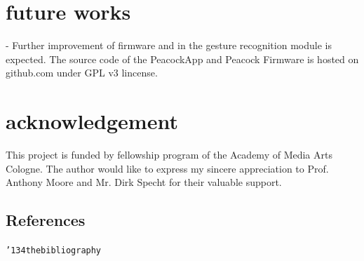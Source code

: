 \documentclass{nime-alternate}
\begin{document}
\section{future works}

- Further improvement of firmware and in the gesture recognition module is expected.
The source code of the PeacockApp and Peacock Firmware is hosted on github.com under GPL v3 lincense.


\section{acknowledgement}
This project is funded by fellowship program of the Academy of Media Arts Cologne. The author would like to express my sincere appreciation to Prof. Anthony Moore and Mr. Dirk Specht for their valuable support.



\subsection{References}
\texttt{{\char'134}thebibliography}
\end{document}
